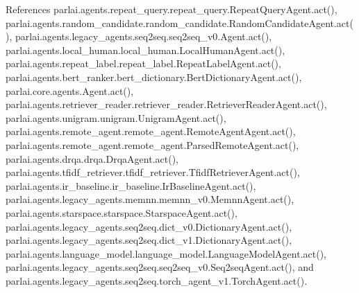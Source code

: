 References parlai.\+agents.\+repeat\+\_\+query.\+repeat\+\_\+query.\+Repeat\+Query\+Agent.\+act(), parlai.\+agents.\+random\+\_\+candidate.\+random\+\_\+candidate.\+Random\+Candidate\+Agent.\+act(), parlai.\+agents.\+legacy\+\_\+agents.\+seq2seq.\+seq2seq\+\_\+v0.\+Agent.\+act(), parlai.\+agents.\+local\+\_\+human.\+local\+\_\+human.\+Local\+Human\+Agent.\+act(), parlai.\+agents.\+repeat\+\_\+label.\+repeat\+\_\+label.\+Repeat\+Label\+Agent.\+act(), parlai.\+agents.\+bert\+\_\+ranker.\+bert\+\_\+dictionary.\+Bert\+Dictionary\+Agent.\+act(), parlai.\+core.\+agents.\+Agent.\+act(), parlai.\+agents.\+retriever\+\_\+reader.\+retriever\+\_\+reader.\+Retriever\+Reader\+Agent.\+act(), parlai.\+agents.\+unigram.\+unigram.\+Unigram\+Agent.\+act(), parlai.\+agents.\+remote\+\_\+agent.\+remote\+\_\+agent.\+Remote\+Agent\+Agent.\+act(), parlai.\+agents.\+remote\+\_\+agent.\+remote\+\_\+agent.\+Parsed\+Remote\+Agent.\+act(), parlai.\+agents.\+drqa.\+drqa.\+Drqa\+Agent.\+act(), parlai.\+agents.\+tfidf\+\_\+retriever.\+tfidf\+\_\+retriever.\+Tfidf\+Retriever\+Agent.\+act(), parlai.\+agents.\+ir\+\_\+baseline.\+ir\+\_\+baseline.\+Ir\+Baseline\+Agent.\+act(), parlai.\+agents.\+legacy\+\_\+agents.\+memnn.\+memnn\+\_\+v0.\+Memnn\+Agent.\+act(), parlai.\+agents.\+starspace.\+starspace.\+Starspace\+Agent.\+act(), parlai.\+agents.\+legacy\+\_\+agents.\+seq2seq.\+dict\+\_\+v0.\+Dictionary\+Agent.\+act(), parlai.\+agents.\+legacy\+\_\+agents.\+seq2seq.\+dict\+\_\+v1.\+Dictionary\+Agent.\+act(), parlai.\+agents.\+language\+\_\+model.\+language\+\_\+model.\+Language\+Model\+Agent.\+act(), parlai.\+agents.\+legacy\+\_\+agents.\+seq2seq.\+seq2seq\+\_\+v0.\+Seq2seq\+Agent.\+act(), and parlai.\+agents.\+legacy\+\_\+agents.\+seq2seq.\+torch\+\_\+agent\+\_\+v1.\+Torch\+Agent.\+act().

